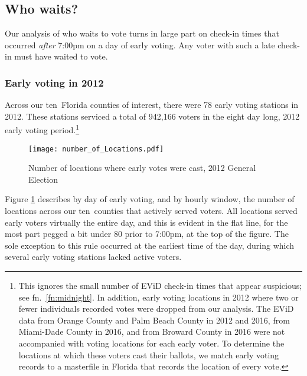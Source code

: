 \documentclass[12pt,titlepage]{article}
\newcommand{\numcounties}{ten}
\begin{document}

\subsection*{Who waits?}

Our analysis of who waits to vote turns in large part on check-in
times that occurred \emph{after} 7:00pm on a day of early voting.  Any
voter with such a late check-in must have waited to vote.

\subsubsection*{Early voting in 2012}

Across our \numcounties\ Florida counties of interest, there were 78
early voting stations in 2012.  These stations serviced a total of
942,166 voters in the eight day long, 2012 early voting
period.\footnote{This ignores the small number of EViD check-in times
  that appear suspicious; see fn.\ \ref{fn:midnight}. In addition,
  early voting locations in 2012 where two or fewer individuals
  recorded votes were dropped from our analysis.  The EViD data from
  Orange County and Palm Beach County in 2012 and 2016, from
  Miami-Dade County in 2016, and from Broward County in 2016 were not
  accompanied with voting locations for each early voter. To determine
  the locations at which these voters cast their ballots, we match
  early voting records to a masterfile in Florida that records the
  location of every vote.} %



\begin{figure}[!ht]
  \caption{Number of locations where early votes were cast, 2012 General Election}
  \label{fig:nrlocs2012}
  \centering
    \centering\texttt{[image: number\_of\_Locations.pdf]}
\end{figure}

Figure \ref{fig:nrlocs2012} describes by day of early voting, and by
hourly window, the number of locations across our \numcounties\
counties that actively served voters. All locations served early
voters virtually the entire day, and this is evident in the flat line,
for the most part pegged a bit under 80 prior to 7:00pm, at the top of
the figure.  The sole exception to this rule occurred at the earliest
time of the day, during which several early voting stations lacked
active voters.
\end{document}
